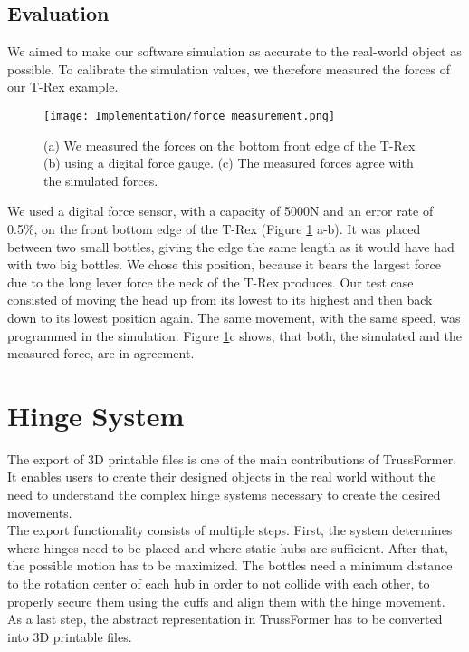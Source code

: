 \subsection{Evaluation}
We aimed to make our software simulation as accurate to the real-world object as possible. To calibrate the simulation values, we therefore measured the forces of our T-Rex example.\\
\begin{figure}[h!]
    \texttt{[image: Implementation/force\_measurement.png]}
    \centering
    \caption{(a) We measured the forces on the bottom front edge of the T-Rex (b) using a digital force gauge. (c) The measured forces agree with the simulated forces.}
    \label{fig:force_measurement}
\end{figure}
We used a digital force sensor, with a capacity of 5000N and an error rate of 0.5\%, on the front bottom edge of the T-Rex (Figure \ref{fig:force_measurement} a-b). It was placed between two small bottles, giving the edge the same length as it would have had with two big bottles. We chose this position, because it bears the largest force due to the long lever force the neck of the T-Rex produces. Our test case consisted of moving the head up from its lowest to its highest and then back down to its lowest position again. The same movement, with the same speed, was programmed in the simulation. Figure \ref{fig:force_measurement}c shows, that both, the simulated and the measured force, are in agreement.

\section{Hinge System}
The export of 3D printable files is one of the main contributions of TrussFormer. It enables users to create their designed objects in the real world without the need to understand the complex hinge systems necessary to create the desired movements.\\
The export functionality consists of multiple steps. First, the system determines where hinges need to be placed and where static hubs are sufficient. After that, the possible motion has to be maximized. The bottles need a minimum distance to the rotation center of each hub in order to not collide with each other, to properly secure them using the cuffs and align them with the hinge movement. As a last step, the abstract representation in TrussFormer has to be converted into 3D printable files.

